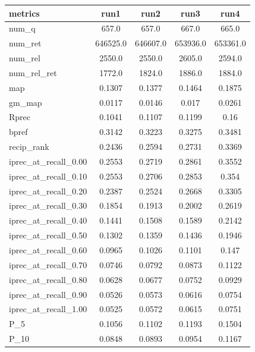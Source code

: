 
\begin{table}[h!]
    \centering
    \begin{tabular}{ |l|c|c|c|c| } 
        \hline
        metrics & run1 & run2 & run3 & run4 \\ \hline
        num\_q & 657.0 & 657.0 & 667.0 & 665.0 \\ \hline
        num\_ret & 646525.0 & 646607.0 & 653936.0 & 653361.0 \\ \hline
        num\_rel & 2550.0 & 2550.0 & 2605.0 & 2594.0 \\ \hline
        num\_rel\_ret & 1772.0 & 1824.0 & 1886.0 & 1884.0 \\ \hline
        map & 0.1307 & 0.1377 & 0.1464 & 0.1875 \\ \hline
        gm\_map & 0.0117 & 0.0146 & 0.017 & 0.0261 \\ \hline
        Rprec & 0.1041 & 0.1107 & 0.1199 & 0.16 \\ \hline
        bpref & 0.3142 & 0.3223 & 0.3275 & 0.3481 \\ \hline
        recip\_rank & 0.2436 & 0.2594 & 0.2731 & 0.3369 \\ \hline
        iprec\_at\_recall\_0.00 & 0.2553 & 0.2719 & 0.2861 & 0.3552 \\ \hline
        iprec\_at\_recall\_0.10 & 0.2553 & 0.2706 & 0.2853 & 0.354 \\ \hline
        iprec\_at\_recall\_0.20 & 0.2387 & 0.2524 & 0.2668 & 0.3305 \\ \hline
        iprec\_at\_recall\_0.30 & 0.1854 & 0.1913 & 0.2002 & 0.2619 \\ \hline
        iprec\_at\_recall\_0.40 & 0.1441 & 0.1508 & 0.1589 & 0.2142 \\ \hline
        iprec\_at\_recall\_0.50 & 0.1302 & 0.1359 & 0.1436 & 0.1946 \\ \hline
        iprec\_at\_recall\_0.60 & 0.0965 & 0.1026 & 0.1101 & 0.147 \\ \hline
        iprec\_at\_recall\_0.70 & 0.0746 & 0.0792 & 0.0873 & 0.1122 \\ \hline
        iprec\_at\_recall\_0.80 & 0.0628 & 0.0677 & 0.0752 & 0.0929 \\ \hline
        iprec\_at\_recall\_0.90 & 0.0526 & 0.0573 & 0.0616 & 0.0754 \\ \hline
        iprec\_at\_recall\_1.00 & 0.0525 & 0.0572 & 0.0615 & 0.0751 \\ \hline
        P\_5 & 0.1056 & 0.1102 & 0.1193 & 0.1504 \\ \hline
        P\_10 & 0.0848 & 0.0893 & 0.0954 & 0.1167 \\ \hline

\end{tabular}
\end{table}
